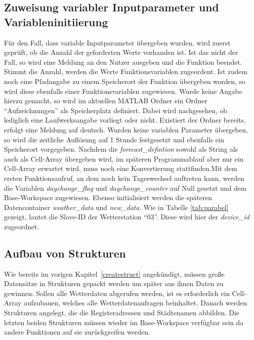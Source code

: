 \subsection{Zuweisung variabler Inputparameter und Variableninitiierung}

Für den Fall, dass variable Inputparameter übergeben wurden, wird zuerst geprüft, ob die Anzahl der geforderten Werte vorhanden ist. Ist das nicht der Fall, so wird eine Meldung an den Nutzer ausgeben und die Funktion beendet. Stimmt die Anzahl, werden die Werte Funktionsvariablen zugeordent. Ist zudem noch eine Pfadangabe zu einem Speicherort der Funktion übergeben worden, so wird diese ebenfalls einer Funktionsvariablen zugewiesen. Wurde keine Angabe hierzu gemacht, so wird im aktuellen MATLAB Ordner ein Ordner \enquote{Aufzeichnungen} als Speicherplatz definiert. Dabei wird nachgesehen, ob lediglich eine Laufwerksangabe vorliegt oder nicht. Existiert der Ordner bereits, erfolgt eine Meldung auf deutsch. Wurden keine variablen Parameter übergeben, so wird die zeitliche Auflösung auf 1 Stunde festgesetzt und ebenfalls ein Speicherort vorgegeben. Nachdem die \textit{forecast\_defintion} sowohl als String als auch als Cell-Array übergeben wird, im späteren Programmablauf aber nur ein Cell-Array erwartet wird, muss noch eine Konvertierung stattfinden.\label{sendloop}Mit dem ersten Funktionsaufruf, an dem noch kein Tageswechsel auftreten kann, werden die Variablen \textit{daychange\_flag} und \textit{daychange\_counter} auf Null gesetzt und dem Base-Workspace zugewiesen. Ebenso initialisiert werden die späteren Datencontainer \textit{weather\_data} und \textit{new\_data}. Wie in Tabelle \ref{tab:parabel} gezeigt, lautet die Slave-ID der Wetterstation \enquote{03}. Diese wird hier der \textit{device\_id} zugeordnet.    
\subsection{Aufbau von Strukturen}
 
Wie bereits im vorigen Kapitel~\ref{createstruct} angekündigt, müssen große Datensätze in Strukturen gepackt werden um später aus ihnen Daten zu gewinnen. Sollen alle Wetterdaten abgerufen werden, ist es erforderlich ein Cell-Array aufzubauen, welches alle Wetterdatenanfragen beinhaltet. Danach werden Strukturen angelegt, die die Registeradressen und Städtenamen abbilden. Die letzten beiden Strukturen müssen wieder im Base-Workspace verfügbar sein da andere Funktionen auf sie zurückgreifen werden.
